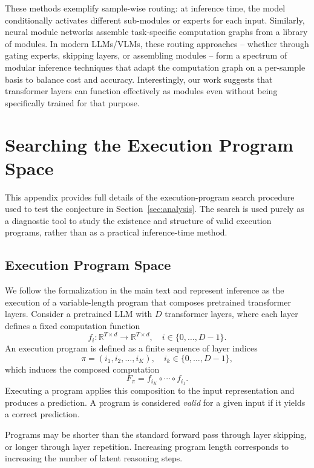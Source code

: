 \documentclass{article}
\theoremstyle{plain}
\theoremstyle{definition}
\theoremstyle{remark}
\begin{document}
These methods exemplify sample-wise routing: at inference time, the model conditionally activates different sub-modules or experts for each input. Similarly, neural module networks \cite{andreas2016neural} assemble task-specific computation graphs from a library of modules. In modern LLMs/VLMs, these routing approaches – whether through gating experts, skipping layers, or assembling modules – form a spectrum of modular inference techniques that adapt the computation graph on a per-sample basis to balance cost and accuracy. Interestingly, our work suggests that transformer layers can function effectively as modules even without being specifically trained for that purpose.


\section{Searching the Execution Program Space}
\label{app:mcts}

This appendix provides full details of the execution-program search procedure
used to test the conjecture in Section~\ref{sec:analysis}.
The search is used purely as a diagnostic tool to study the existence
and structure of valid execution programs, rather than as a practical inference-time method.

\subsection{Execution Program Space}

We follow the formalization in the main text and represent inference
as the execution of a variable-length program that composes pretrained transformer layers.
Consider a pretrained LLM with $D$ transformer layers,
where each layer defines a fixed computation function
\[
f_i : \mathbb{R}^{T \times d} \rightarrow \mathbb{R}^{T \times d},
\quad i \in \{0,\ldots,D-1\}.
\]
An execution program is defined as a finite sequence of layer indices
\[
\pi = (i_1, i_2, \ldots, i_K), \quad i_k \in \{0,\ldots,D-1\},
\]
which induces the composed computation
\[
F_{\pi} = f_{i_K} \circ \cdots \circ f_{i_1}.
\]
Executing a program applies this composition to the input representation
and produces a prediction.
A program is considered \emph{valid} for a given input
if it yields a correct prediction.

Programs may be shorter than the standard forward pass through layer skipping,
or longer through layer repetition.
Increasing program length corresponds to increasing the number of
latent reasoning steps.
\end{document}
